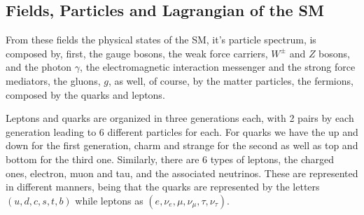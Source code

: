 \subsection{Fields, Particles and Lagrangian of the SM}

From these fields the physical states of the SM, it's particle spectrum, is composed by, first, the gauge bosons, the weak force carriers, $W^\pm$ and $Z$ bosons, and the photon $\gamma$, the electromagnetic interaction messenger and the strong force mediators, the gluons, $g$, as well, of course, by the matter particles, the fermions, composed by the quarks and leptons. 

Leptons and quarks are organized in three generations each, with 2 pairs by each generation leading to 6 different particles for each. 
%
For quarks we have the up and down for the first generation, charm and strange for the second as well as top and bottom for the third one. 
%
Similarly, there are 6 types of leptons, the charged ones, electron, muon and tau, and the associated neutrinos. These are represented in different manners, being that the quarks are represented by the letters $(u,d,c,s,t,b)$ while leptons as $(e,\nu_{e},\mu,\nu_{\mu},\tau,\nu_{\tau})$. 

